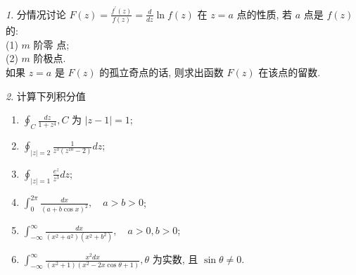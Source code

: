 \documentclass[11pt]{article}
\theoremstyle{remark}
\newtheorem{problem}{}
\begin{document}
  
\begin{problem}
分情况讨论 $F(z)=\frac{f^{\prime}(z)}{f(z)}=\frac{d}{d z} \ln f(z)$ 在 $z=a$ 点的性质, 
  若 $a$ 点是 $f(z)$ 的: 
  \\
  (1) $m$ 阶零 点; 
  \\
  (2) $m$ 阶极点.
  \\
  如果 $z=a$ 是 $F(z)$ 的孤立奇点的话, 则求出函数 $F(z)$ 在该点的留数.
\end{problem}


\begin{problem}
  计算下列积分值
  \begin{enumerate}
    \item $\oint_C \frac{d z}{1+z^4}, C$ 为 $|z-1|=1$;
    \item $\oint_{|z|=2} \frac{1}{z^3\left(z^{10}-2\right)} d z$;
    \item $\oint_{|z|=1} \frac{e^z}{z^3} d z$; 
    \item $\int_0^{2 \pi} \frac{d x}{(a+b \cos x)^2}, \quad a>b>0$;
    \item $\int_{-\infty}^{\infty} \frac{d x}{(x^2 + a^2)(x^2+b^2)}, \quad a>0, b>0$;
    \item $\int_{-\infty}^{\infty} \frac{x^2 d x}{\left(x^2+1\right)\left(x^2-2 x \cos \theta+1\right)}, \theta$ 为实数, 且 $\sin \theta \neq 0$.
  \end{enumerate}

\end{problem}
\end{document}
